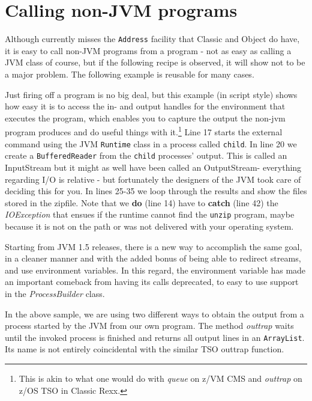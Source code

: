 \chapter{Calling non-JVM programs}
Although \nr{} currently misses the \texttt{Address} facility that
Classic \Rexx{} and Object \Rexx{} do have, it is easy to call non-JVM programs
from a \nr{} program - not as easy as calling a JVM class of course, but if
the following recipe is observed, it will show not to be a major
problem. The following example is reusable for many cases.
 
Just firing off a program is no big deal, but this example (in script
style) shows how easy it is to access the in- and output handles for
the environment that executes the program, which enables you to
capture the output the non-jvm program produces and do useful things
with it.\footnote{This is akin to what one would do with \emph{queue}
  on z/VM CMS and \emph{outtrap} on z/OS TSO in Classic Rexx.}
Line 17 starts the external command using the JVM \texttt{Runtime}
class in a process called \texttt{child}. In line 20 we create a
\texttt{BufferedReader} from the \texttt{child} processes'
output. This is called an InputStream but it might as well have been
called an OutputStream- everything regarding I/O is relative - but
fortunately the designers of the JVM took care of deciding this for you.
In lines 25-35 we loop through the results and show the files stored
in the zipfile. Note that we \textbf{do} (line 14) have to \textbf{catch} (line
42) the \emph{IOException} that ensues if the runtime cannot find the
\texttt{unzip} program, maybe because it is not on the path or was not
delivered with your operating system. 



Starting from JVM 1.5 releases, there is a new way to accomplish the
same goal, in a cleaner manner and with the added bonus of being able
to redirect streams, and use environment variables. In this regard,
the environment variable has made an important comeback from having
its calls deprecated, to easy to use support in the
\emph{ProcessBuilder} class. 
 
In the above sample, we are using two different ways to obtain the
output from a process started by the JVM from our own program. The
method \emph{outtrap} waits until the invoked process is finished and
returns all output lines in an \texttt{ArrayList}. Its name is not
entirely coincidental with the similar TSO outtrap function. 


